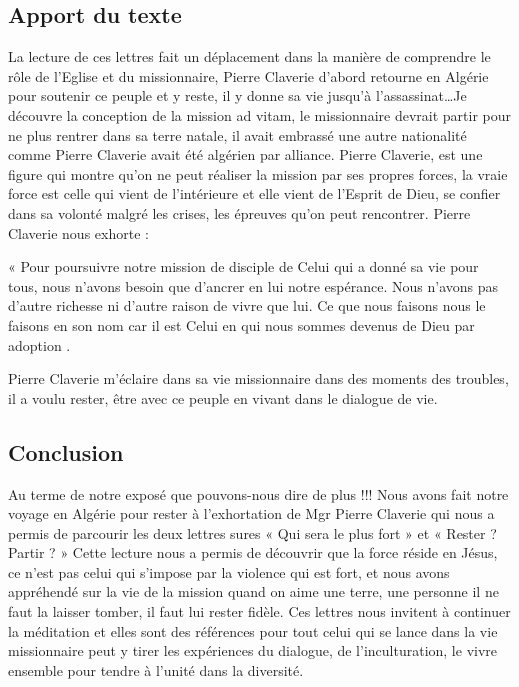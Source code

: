 \subsection{Apport du texte  }
 
La lecture de ces lettres fait un déplacement dans la manière de comprendre le rôle de l’Eglise et du missionnaire, Pierre Claverie d’abord retourne en Algérie pour soutenir ce peuple et y reste, il y donne sa vie jusqu’à l’assassinat…Je découvre la conception de la mission ad vitam, le missionnaire devrait partir pour ne plus rentrer dans sa terre natale, il avait embrassé une autre nationalité comme Pierre Claverie avait été algérien par alliance. 
Pierre Claverie, est une figure qui montre qu’on ne peut réaliser la mission par ses propres forces, la vraie force est celle qui vient de l’intérieure et elle vient de l’Esprit de Dieu, se confier dans sa volonté malgré les crises, les épreuves qu’on peut rencontrer. 
Pierre Claverie nous exhorte : 
\begin{singlequote}
    « Pour poursuivre notre mission de disciple de Celui qui a donné sa vie pour tous, nous n’avons besoin que d’ancrer en lui notre espérance. Nous n’avons pas d’autre richesse ni d’autre raison de vivre que lui. Ce que nous faisons nous le faisons en son nom car il est Celui en qui nous sommes devenus de Dieu par adoption . 
\end{singlequote}
              Pierre Claverie m’éclaire dans sa vie missionnaire dans des moments des troubles, il a voulu rester, être avec ce peuple en vivant dans le dialogue de vie. 	

\subsection{Conclusion}

             Au terme de notre exposé que pouvons-nous dire de plus !!! Nous avons fait notre voyage en Algérie pour rester à l’exhortation de Mgr Pierre Claverie qui nous a permis de parcourir les deux lettres sures « Qui sera le plus fort » et « Rester ? Partir ? » 
            Cette lecture nous a permis de découvrir que la force réside en Jésus, ce n’est pas celui qui s’impose par la violence qui est fort, et nous avons appréhendé sur la vie de la mission quand on aime une terre, une personne il ne faut la laisser tomber, il faut lui rester fidèle. 
            Ces lettres nous invitent à continuer la méditation et elles sont des références pour tout celui qui se lance dans la vie missionnaire peut y tirer les expériences du dialogue, de l’inculturation, le vivre ensemble pour tendre à l’unité dans la diversité.
            
